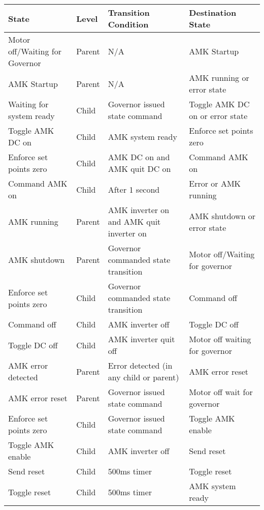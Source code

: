 \documentclass[12pt, titlepage]{article}
\newcommand{\tableVspace}{5mm}
\begin{document}
\vspace{\tableVspace}\noindent
\begin{tabular}{| p{} | p{} | p{} | p{} | }
\hline
\rowcolor[gray]{0.9}
\hline
State & Level & Transition Condition & Destination State \\
\hline
Motor off/Waiting for Governor & Parent & N/A & AMK Startup\\
\hline
AMK Startup & Parent & N/A & AMK running or error state\\
\hline
Waiting for system ready & Child & Governor issued state command & Toggle AMK DC on or error state\\
\hline
Toggle AMK DC on & Child & AMK system ready & Enforce set points zero\\
\hline
Enforce set points zero & Child & AMK DC on and AMK quit DC on  & Command AMK on\\
\hline
Command AMK on & Child & After 1 second & Error or AMK running\\
\hline
AMK running & Parent & AMK inverter on and AMK quit inverter on & AMK shutdown or error state\\
\hline
AMK shutdown & Parent & Governor commanded state transition & Motor off/Waiting for governor\\
\hline
Enforce set points zero & Child & Governor commanded state transition & Command off\\
\hline
Command off & Child & AMK inverter off & Toggle DC off\\
\hline
Toggle DC off & Child & AMK inverter quit off & Motor off waiting for governor\\
\hline
AMK error detected & Parent & Error detected (in any child or parent) & AMK error reset\\
\hline
AMK error reset & Parent & Governor issued state command & Motor off wait for governor\\
\hline
Enforce set points zero & Child & Governor issued state command & Toggle AMK enable\\
\hline
Toggle AMK enable & Child & AMK inverter off & Send reset\\
\hline
Send reset & Child & 500ms timer & Toggle reset\\
\hline
Toggle reset & Child & 500ms timer & AMK system ready\\
\hline
\end{tabular}
\end{document}
